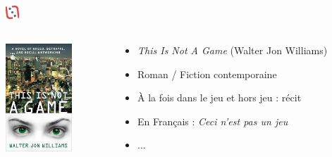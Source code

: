 \documentclass[slidetop,11pt]{beamer}
\def\moreInFrameTitleLeftt{\includegraphics[height=0.5cm]{img/ligueludique-0.png}~~~~~}
\begin{document}
\subsubsection{\sectionPartIIaVI}
\begin{frame}
	\frametitle{\moreInFrameTitleLeftt \sectionPartIIaVI }
	\begin{columns}[T]
		\begin{column}[T]{4.1cm}
			\includegraphics[height=4.05cm]{img/thisIsNotAGameWJW.jpg}
		\end{column}
		\begin{column}[T]{7cm}
			 \begin{beamerboxesrounded}	[lower=substructureRED, %
							 upper=block title RED,%
							 shadow=true]%
				   {\sectionPartIIaVI}
				\begin{itemize}
					\item \emph{This Is Not A Game} (Walter Jon Williams)
					\item Roman / Fiction contemporaine
					\item {\`A} la fois dans le jeu et hors jeu : r{\'e}cit
					\item En Fran\c{c}ais : \emph{Ceci n'est pas un jeu}
					\item ...
				\end{itemize}
			\end{beamerboxesrounded}
		\end{column}
	\end{columns}
\end{frame} 

\def\sectionPartIIaVII{The Web Soap}
\end{document}
